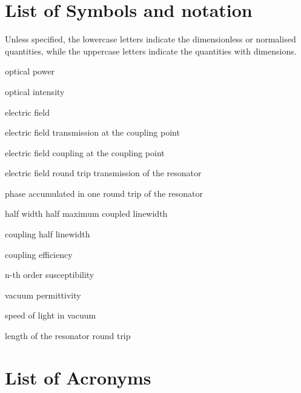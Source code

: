 \section*{List of Symbols and notation} %

Unless specified, the lowercase letters indicate the dimensionless or normalised quantities, while the uppercase letters indicate the quantities with dimensions.

\begin{description}[leftmargin=2cm,style=sameline,noitemsep,font=\normalfont]
	\item[$P$] optical power
	\item[$I$] optical intensity
	\item[$E$] electric field
\end{description}

\begin{description}[leftmargin=2cm,style=sameline,noitemsep,font=\normalfont]
	\item[$t$] electric field transmission at the coupling point
	\item[$k$] electric field coupling at the coupling point
	\item[$\alpha$] electric field round trip transmission of the resonator
	\item[$\theta$] phase accumulated in one round trip of the resonator
	\item[$\gamma$] half width half maximum coupled linewidth
	\item[$\kappa$] coupling half linewidth
	\item[$\eta$] coupling efficiency
	\item[$\chi^{(n)}$] n-th order susceptibility
	\item[$\varepsilon_0$] vacuum permittivity
	\item[$c$] speed of light in vacuum
	\item[$L$] length of the resonator round trip
\end{description}


\section*{List of Acronyms} %

